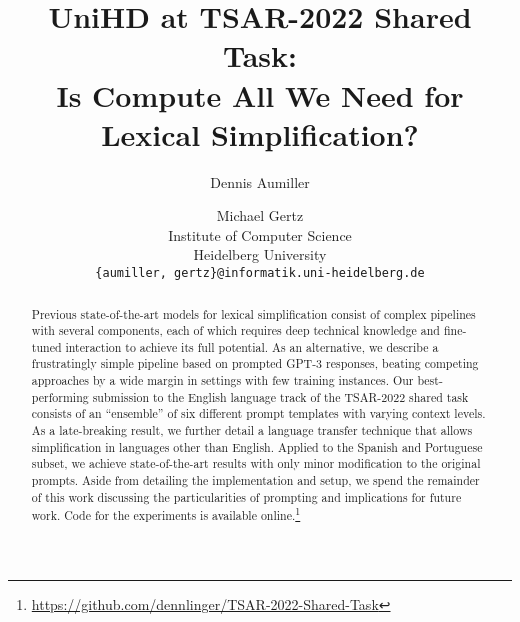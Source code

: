 \documentclass[11pt]{article}
\title{UniHD at TSAR-2022 Shared Task:\\ Is Compute All We Need for Lexical Simplification?}
\author{Dennis Aumiller \and Michael Gertz \\
  Institute of Computer Science \\
  Heidelberg University \\
  \texttt{\{aumiller, gertz\}@informatik.uni-heidelberg.de}}
\begin{document}
\maketitle
\begin{abstract}
Previous state-of-the-art models for lexical simplification consist of complex pipelines with several components, each of which requires deep technical knowledge and fine-tuned interaction to achieve its full potential.
As an alternative, we describe a frustratingly simple pipeline based on prompted GPT-3 responses, beating competing approaches by a wide margin in settings with few training instances.
Our best-performing submission to the English language track of the TSAR-2022 shared task consists of an ``ensemble'' of six different prompt templates with varying context levels. As a late-breaking result, we further detail a language transfer technique that allows simplification in languages other than English. Applied to the Spanish and Portuguese subset, we achieve state-of-the-art results with only minor modification to the original prompts.
Aside from detailing the implementation and setup, we spend the remainder of this work discussing the particularities of prompting and implications for future work.
Code for the experiments is available online.\footnote{\url{https://github.com/dennlinger/TSAR-2022-Shared-Task}}
\end{abstract}
\end{document}
